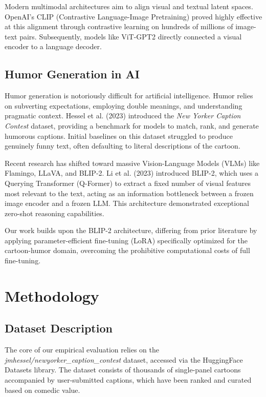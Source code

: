 \documentclass[10pt, conference, compsoc]{IEEEtran}
\begin{document}
Modern multimodal architectures aim to align visual and textual latent spaces. OpenAI's CLIP (Contrastive Language-Image Pretraining) proved highly effective at this alignment through contrastive learning on hundreds of millions of image-text pairs. Subsequently, models like ViT-GPT2 directly connected a visual encoder to a language decoder.

\subsection{Humor Generation in AI}
Humor generation is notoriously difficult for artificial intelligence. Humor relies on subverting expectations, employing double meanings, and understanding pragmatic context. Hessel et al. (2023) introduced the \textit{New Yorker Caption Contest} dataset, providing a benchmark for models to match, rank, and generate humorous captions. Initial baselines on this dataset struggled to produce genuinely funny text, often defaulting to literal descriptions of the cartoon.

Recent research has shifted toward massive Vision-Language Models (VLMs) like Flamingo, LLaVA, and BLIP-2. Li et al. (2023) introduced BLIP-2, which uses a Querying Transformer (Q-Former) to extract a fixed number of visual features most relevant to the text, acting as an information bottleneck between a frozen image encoder and a frozen LLM. This architecture demonstrated exceptional zero-shot reasoning capabilities.

Our work builds upon the BLIP-2 architecture, differing from prior literature by applying parameter-efficient fine-tuning (LoRA) specifically optimized for the cartoon-humor domain, overcoming the prohibitive computational costs of full fine-tuning.

\section{Methodology}

\subsection{Dataset Description}
The core of our empirical evaluation relies on the \textit{jmhessel/newyorker\_caption\_contest} dataset, accessed via the HuggingFace Datasets library. The dataset consists of thousands of single-panel cartoons accompanied by user-submitted captions, which have been ranked and curated based on comedic value.
\end{document}
